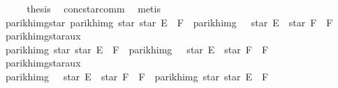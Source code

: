 \begin{isabellebody}
\ \ \isamarkupfalse%
\ \isamarkupfalse%
\ {\isacharquery}{\kern0pt}thesis\ \isamarkupfalse%
\ conc{\isacharunderscore}{\kern0pt}star{\isacharunderscore}{\kern0pt}comm\ \isamarkupfalse%
\ metis\isanewline
{}\isamarkupfalse%
%
\endisatagproof
{\isafoldproof}%
%
\isadelimproof
\isanewline
%
\endisadelimproof
\isanewline
{}\isamarkupfalse%
\ parikh{\isacharunderscore}{\kern0pt}img{\isacharunderscore}{\kern0pt}star{}{\isacharcolon}{\kern0pt}\ {\isachardoublequoteopen}parikh{\isacharunderscore}{\kern0pt}img\ {\isacharparenleft}{\kern0pt}star\ {\isacharparenleft}{\kern0pt}star\ E\ {\isacharat}{\kern0pt}{\isacharat}{\kern0pt}\ F{\isacharparenright}{\kern0pt}{\isacharparenright}{\kern0pt}\ {\isacharequal}{\kern0pt}\ parikh{\isacharunderscore}{\kern0pt}img\ {\isacharparenleft}{\kern0pt}{\isacharbraceleft}{\kern0pt}{\isacharbrackleft}{\kern0pt}{\isacharbrackright}{\kern0pt}{\isacharbraceright}{\kern0pt}\ {\isasymunion}\ star\ E\ {\isacharat}{\kern0pt}{\isacharat}{\kern0pt}\ star\ F\ {\isacharat}{\kern0pt}{\isacharat}{\kern0pt}\ F{\isacharparenright}{\kern0pt}{\isachardoublequoteclose}\isanewline
%
\isadelimproof
%
\endisadelimproof
%
\isatagproof
{}\isamarkupfalse%
\isanewline
\ \ \isamarkupfalse%
\ parikh{\isacharunderscore}{\kern0pt}img{\isacharunderscore}{\kern0pt}star{}{\isacharunderscore}{\kern0pt}aux{}\isanewline
\ \ \ \ \isamarkupfalse%
\ {\isachardoublequoteopen}parikh{\isacharunderscore}{\kern0pt}img\ {\isacharparenleft}{\kern0pt}star\ {\isacharparenleft}{\kern0pt}star\ E\ {\isacharat}{\kern0pt}{\isacharat}{\kern0pt}\ F{\isacharparenright}{\kern0pt}{\isacharparenright}{\kern0pt}\ {\isasymsubseteq}\ parikh{\isacharunderscore}{\kern0pt}img\ {\isacharparenleft}{\kern0pt}{\isacharbraceleft}{\kern0pt}{\isacharbrackleft}{\kern0pt}{\isacharbrackright}{\kern0pt}{\isacharbraceright}{\kern0pt}\ {\isasymunion}\ star\ E\ {\isacharat}{\kern0pt}{\isacharat}{\kern0pt}\ star\ F\ {\isacharat}{\kern0pt}{\isacharat}{\kern0pt}\ F{\isacharparenright}{\kern0pt}{\isachardoublequoteclose}\ \isakeywordONE{{\isachardot}{\kern0pt}}\isamarkupfalse%
\isanewline
\ \ \isamarkupfalse%
\ parikh{\isacharunderscore}{\kern0pt}img{\isacharunderscore}{\kern0pt}star{}{\isacharunderscore}{\kern0pt}aux{}\isanewline
\ \ \ \ \isamarkupfalse%
\ {\isachardoublequoteopen}parikh{\isacharunderscore}{\kern0pt}img\ {\isacharparenleft}{\kern0pt}{\isacharbraceleft}{\kern0pt}{\isacharbrackleft}{\kern0pt}{\isacharbrackright}{\kern0pt}{\isacharbraceright}{\kern0pt}\ {\isasymunion}\ star\ E\ {\isacharat}{\kern0pt}{\isacharat}{\kern0pt}\ star\ F\ {\isacharat}{\kern0pt}{\isacharat}{\kern0pt}\ F{\isacharparenright}{\kern0pt}\ {\isasymsubseteq}\ parikh{\isacharunderscore}{\kern0pt}img\ {\isacharparenleft}{\kern0pt}star\ {\isacharparenleft}{\kern0pt}star\ E\ {\isacharat}{\kern0pt}{\isacharat}{\kern0pt}\ F{\isacharparenright}{\kern0pt}{\isacharparenright}{\kern0pt}{\isachardoublequoteclose}\isanewline

\end{isabellebody}
